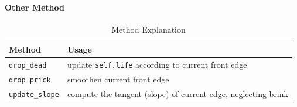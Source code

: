\documentclass[12pt]{article}
\begin{document}
\paragraph{Other Method}

\begin{table}[H]
    \caption{Method Explanation}
    \vspace{20pt}
    \centering
    \begin{tabular}{p{3cm}p{12cm}}
        \hline
        \textbf{Method}        & \textbf{Usage}                                                \\
        \hline
        \texttt{drop\_dead}    & update \texttt{self.life} according to current front edge     \\
        \texttt{drop\_prick}   & smoothen current front edge                                   \\
        \texttt{update\_slope} & compute the tangent (slope) of current edge, neglecting brink \\
        \hline
    \end{tabular}
    \label{tab:method_explanation}
\end{table}
\end{document}
